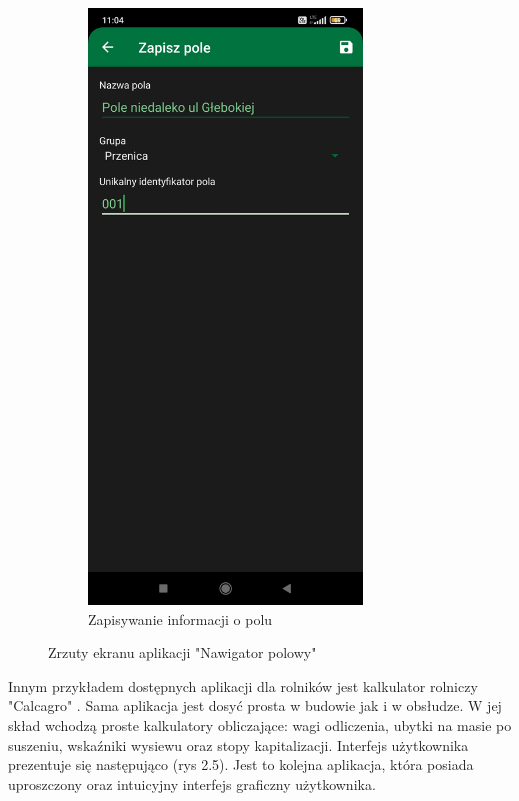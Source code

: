 \documentclass[a4paper,12pt,oneside]{book}
\begin{document}
\begin{figure}[H]
\begin{subfigure}{.5\textwidth}
			\includegraphics[width=0.8\textwidth]{grafika/nawigator_0.jpg}
			\caption{Zapisywanie informacji o polu}
		\end{subfigure}
		\caption{Zrzuty ekranu aplikacji "Nawigator polowy"}
	\end{figure}
	
	Innym przykładem dostępnych aplikacji dla rolników jest kalkulator rolniczy "Calcagro" \cite{ref7}. Sama aplikacja jest dosyć prosta w budowie jak i w obsłudze. W jej skład wchodzą proste kalkulatory obliczające: wagi odliczenia, ubytki na masie po suszeniu, wskaźniki wysiewu oraz stopy kapitalizacji. Interfejs użytkownika prezentuje się następująco (rys 2.5). Jest to kolejna aplikacja, która posiada uproszczony oraz intuicyjny interfejs graficzny użytkownika.
	
\end{document}
